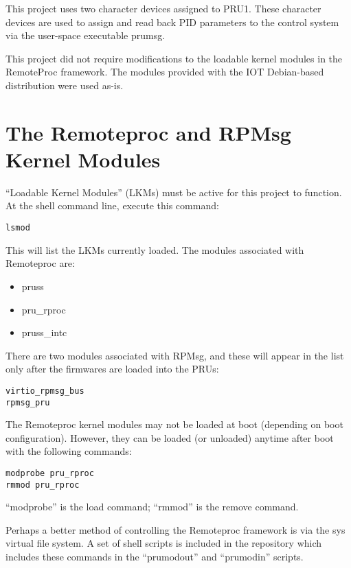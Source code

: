 This project uses two character devices assigned to PRU1.  These character devices are used to assign and read back PID parameters to the control system via the user-space executable prumsg.

This project did not require modifications to the loadable kernel modules in the RemoteProc framework.  The modules provided with the IOT Debian-based distribution were used as-is.

\section{The Remoteproc and RPMsg Kernel Modules}

``Loadable Kernel Modules'' (LKMs) must be active for this project to function.
At the shell command line, execute this command:

\begin{verbatim}
lsmod
\end{verbatim}

This will list the LKMs currently loaded.  The modules associated with Remoteproc are:

\begin{itemize}
\item pruss
\item pru\_rproc
\item pruss\_intc
\end{itemize}

There are two modules associated with RPMsg, and these will appear in the list only after the firmwares are loaded into the PRUs:

\begin{verbatim}
virtio_rpmsg_bus
rpmsg_pru
\end{verbatim}

The Remoteproc kernel modules may not be loaded at boot (depending on boot configuration).  However, they can be loaded (or unloaded) anytime after boot with the following commands:

\begin{verbatim}
modprobe pru_rproc
rmmod pru_rproc
\end{verbatim}

``modprobe'' is the load command; ``rmmod'' is the remove command.

Perhaps a better method of controlling the Remoteproc framework is via the sys virtual file system.  A set of shell scripts is included in the repository which includes these commands in the ``prumodout'' and ``prumodin'' scripts.


